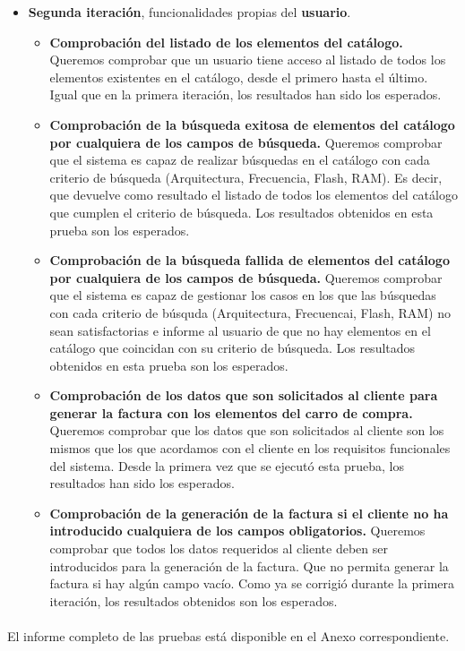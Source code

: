 \begin{itemize}
\item \vspace{0.1in} \textbf{Segunda iteración}, funcionalidades propias del \textbf{usuario}.
	\begin{itemize}
	\item \textbf{Comprobación del listado de los elementos del catálogo.} Queremos comprobar que un usuario tiene acceso al listado de todos los elementos existentes en el catálogo, desde el primero hasta el último. Igual que en la primera iteración, los resultados han sido los esperados.
	
	\item \textbf{Comprobación de la búsqueda exitosa de elementos del catálogo por cualquiera de los campos de búsqueda.} Queremos comprobar que el sistema es capaz de realizar búsquedas en el catálogo con cada criterio de búsqueda (Arquitectura, Frecuencia, Flash, RAM). Es decir, que devuelve como resultado el listado de todos los elementos del catálogo que cumplen el criterio de búsqueda. Los resultados obtenidos en esta prueba son los esperados.
	
	\item \textbf{Comprobación de la búsqueda fallida de elementos del catálogo por cualquiera de los campos de búsqueda.} Queremos comprobar que el sistema es capaz de gestionar los casos en los que las búsquedas con cada criterio de búsquda (Arquitectura, Frecuencai, Flash, RAM) no sean satisfactorias e informe al usuario de que no hay elementos en el catálogo que coincidan con su criterio de búsqueda. Los resultados obtenidos en esta prueba son los esperados.

	\item \textbf{Comprobación de los datos que son solicitados al cliente para generar la factura con los elementos del carro de compra.} Queremos comprobar que los datos que son solicitados al cliente son los mismos que los que acordamos con el cliente en los requisitos funcionales del sistema. Desde la primera vez que se ejecutó esta prueba, los resultados han sido los esperados.
	
	\item \textbf{Comprobación de la generación de la factura si el cliente no ha introducido cualquiera de los campos obligatorios.} Queremos comprobar que todos los datos requeridos al cliente deben ser introducidos para la generación de la factura. Que no permita generar la factura si hay algún campo vacío. Como ya se corrigió durante la primera iteración, los resultados obtenidos son los esperados.
	\end{itemize}			
\end{itemize}
\paragraph{}El informe completo de las pruebas está disponible en el Anexo correspondiente.